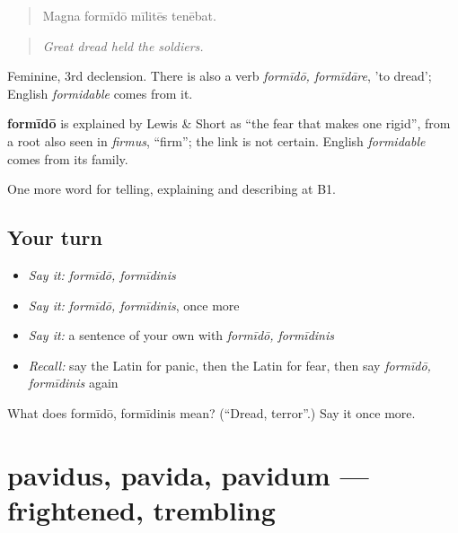 \begin{quote}
Magna formīdō mīlitēs tenēbat.
\end{quote}

\begin{quote}
\emph{Great dread held the soldiers.}
\end{quote}

Feminine, 3rd declension. There is also a verb \emph{formīdō, formīdāre}, 'to dread'; English \emph{formidable} comes from it.

\begin{cousinweb}
\textbf{formīdō} is explained by Lewis \& Short as \textquotedblleft{}the fear that makes one rigid\textquotedblright{}, from a root also seen in \emph{firmus}, \textquotedblleft{}firm\textquotedblright{}; the link is not certain. English \emph{formidable} comes from its family.
\end{cousinweb}

\begin{grammarlens}[title={What you've built}]
One more word for telling, explaining and describing at B1.
\end{grammarlens}

\subsection*{Your turn}
\begin{itemize}
\raggedright
  \item \emph{Say it:} \emph{formīdō, formīdinis}
  \item \emph{Say it:} \emph{formīdō, formīdinis}, once more
  \item \emph{Say it:} a sentence of your own with \emph{formīdō, formīdinis}
  \item \emph{Recall:} say the Latin for panic, then the Latin for fear, then say \emph{formīdō, formīdinis} again
\end{itemize}

\begin{tcolorbox}[breakable,colback=teal!4,colframe=teal!35!black,title={Before you move on}]
What does formīdō, formīdinis mean? (\textquotedblleft{}Dread, terror\textquotedblright{}.) Say it once more.
\end{tcolorbox}
\section[pavidus, pavida, pavidum]{pavidus, pavida, pavidum — frightened, trembling}

